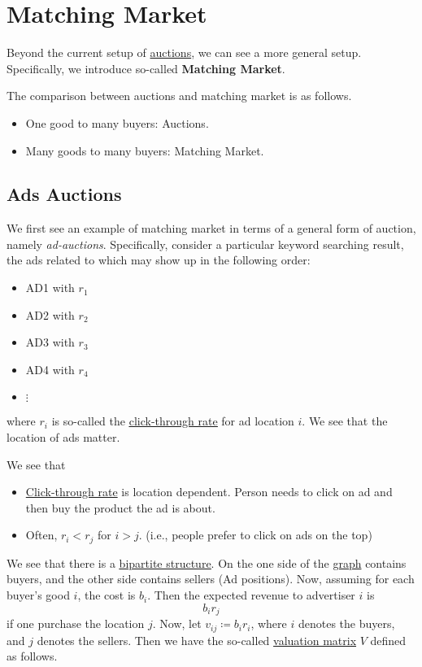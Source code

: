 \chapter{Matching Market}
Beyond the current setup of \hyperref[ch:auctions]{auctions}, we can see a more general setup. Specifically, we introduce so-called
\textbf{Matching Market}.

\begin{note}
	The comparison between auctions and matching market is as follows.
	\begin{itemize}
		\item One good to many buyers: Auctions.
		\item Many goods to many buyers: Matching Market.
	\end{itemize}
\end{note}

\section{Ads Auctions}
We first see an example of matching market in terms of a general form of auction, namely \emph{ad-auctions}. Specifically, consider a
particular keyword searching result, the ads related to which may show up in the following order:
\begin{itemize}
	\item AD1 with \(r_1\)
	\item AD2 with \(r_2\)
	\item AD3 with \(r_3\)
	\item AD4 with \(r_4\)
	\item \(\vdots\)
\end{itemize}
where \(r_i\) is so-called the \href{https://en.wikipedia.org/wiki/Click-through_rate}{\underline{click-through rate}} for ad location \(i\). We see that the location of ads matter.

\begin{note}
	We see that
	\begin{itemize}
		\item \href{https://en.wikipedia.org/wiki/Click-through_rate}{Click-through rate} is location dependent. Person needs to click on ad and then buy the product the ad is about.
		\item Often, \(r_i < r_j\) for \(i > j\). (i.e., people prefer to click on ads on the top)
	\end{itemize}
\end{note}

We see that there is a \href{https://en.wikipedia.org/wiki/Bipartite_graph}{\underline{bipartite structure}}. On the one side of the \hyperref[def:graph]{graph} contains buyers,
and the other side contains sellers (Ad positions). Now, assuming for each buyer's good \(i\), the cost is \(b_i\). Then the expected revenue to advertiser \(i\) is
\[
	b_i r_j
\]
if one purchase the location \(j\). Now, let \(v_{ij} \coloneqq b_{i}r_{i}\), where \(i\) denotes the buyers, and \(j\) denotes the sellers.
Then we have the so-called \hyperref[def:valuation-matrix]{valuation matrix} \(V\) defined as follows.

